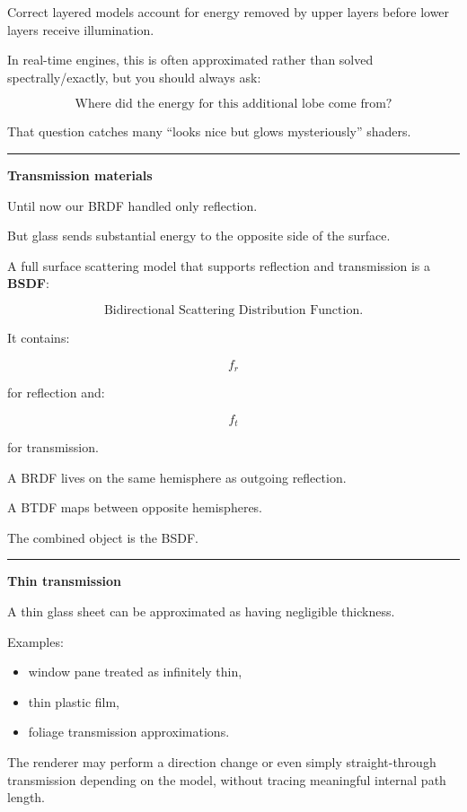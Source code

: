 Correct layered models account for energy removed by upper layers before lower layers receive illumination.

In real-time engines, this is often approximated rather than solved spectrally/exactly, but you should always ask:

\[
\boxed{
\text{Where did the energy for this additional lobe come from?}
}
\]

That question catches many ``looks nice but glows mysteriously'' shaders.

\begin{center}\rule{0.5\linewidth}{0.5pt}\end{center}

\textbf{Transmission materials}

Until now our BRDF handled only reflection.

But glass sends substantial energy to the opposite side of the surface.

A full surface scattering model that supports reflection and transmission is a \textbf{BSDF}:

\[
\text{Bidirectional Scattering Distribution Function}.
\]

It contains:

\[
f_r
\]

for reflection and:

\[
f_t
\]

for transmission.

A BRDF lives on the same hemisphere as outgoing reflection.

A BTDF maps between opposite hemispheres.

The combined object is the BSDF.

\begin{center}\rule{0.5\linewidth}{0.5pt}\end{center}

\textbf{Thin transmission}

A thin glass sheet can be approximated as having negligible thickness.

Examples:

\begin{itemize}
\tightlist
\item
  window pane treated as infinitely thin,
\item
  thin plastic film,
\item
  foliage transmission approximations.
\end{itemize}

The renderer may perform a direction change or even simply straight-through transmission depending on the model, without tracing meaningful internal path length.

